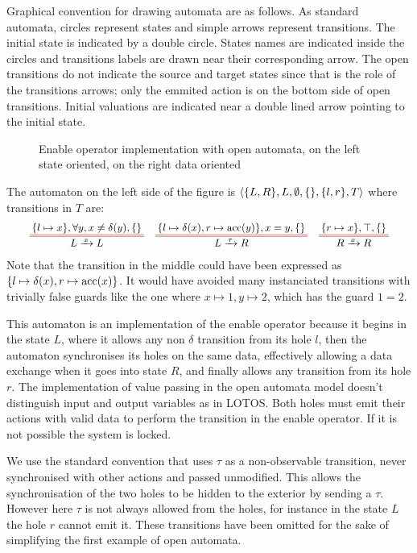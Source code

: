 \documentclass{article}
\begin{document}
\begin{exi}
Graphical convention for drawing automata are as follows.
As standard automata, circles represent states and simple arrows represent transitions.
The initial state is indicated by a double circle.
States names are indicated inside the circles and transitions labels are drawn near their corresponding arrow.
The open transitions do not indicate the source and target states since that is the role of the transitions arrows; only the emmited action is on the bottom side of open transitions.
Initial valuations are indicated near a double lined arrow pointing to the initial state.

\begin{figure}
\centering

\vrule

\caption{Enable operator implementation with open automata, on the left state oriented, on the right data oriented}
\label{fig:enable}
\end{figure}
The automaton on the left side of the figure is \(\left<{\left\{L, R\right\}},L,\emptyset,{\left\{\right\}},{\left\{l, r\right\}},T\right>\) where transitions in \(T\) are:
\begin{align*}
	\OT{L}{L}{x}{\mbrc{l \mapsto x}}{\forall y, x \neq \delta\mpar{y}}{\mbrc{}} &&
	\OT{L}{R}{\tau}{\mbrc{l \mapsto \delta\mpar{x}, r \mapsto \act{acc}\mpar{y}}}{x = y}{\mbrc{}} &&
	\OT{R}{R}{x}{\mbrc{r \mapsto x}}{\top}{\mbrc{}}
\end{align*}
Note that the transition in the middle could have been expressed as \({\left\{l \mapsto \delta{\left(x\right)}, r \mapsto \mathrm{acc}{\left(x\right)}\right\}}\).
It would have avoided many instanciated transitions with trivially false guards like the one where \(x \mapsto 1, y \mapsto 2\), which has the guard \(1 = 2\).

This automaton is an implementation of the enable operator because it begins in the state \(L\), where it allows any non \(\delta\) transition from its hole \(l\), then the automaton synchronises its holes on the same data, effectively allowing a data exchange when it goes into state \(R\), and finally allows any transition from its hole \(r\).
The implementation of value passing in the open automata model doesn't distinguish input and output variables as in LOTOS.
Both holes must emit their actions with valid data to perform the transition in the enable operator.
If it is not possible the system is locked.

We use the standard convention that uses \(\tau\) as a non-observable transition, never synchronised with other actions and passed unmodified.
This allows the synchronisation of the two holes to be hidden to the exterior by sending a \(\tau\).
However here \(\tau\) is not always allowed from the holes, for instance in the state \(L\) the hole \(r\) cannot emit it.
These transitions have been omitted for the sake of simplifying the first example of open automata.
\end{exi}
\end{document}
